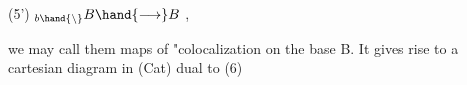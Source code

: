 (5') \qquad ${}_{b\hand{\backslash}}B \hand{\longrightarrow} B$ \quad ,

we may call them maps of "colocalization on the base B.  It gives
rise to a cartesian diagram in (Cat) dual to (6)



